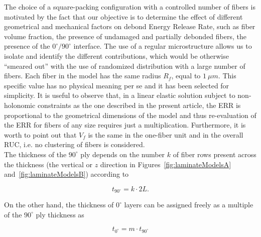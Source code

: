 \documentclass[review]{elsarticle}
\begin{document}
The choice of a square-packing configuration with a controlled number of fibers is motivated by the fact that our objective is to determine the effect of different geometrical and mechanical factors on debond Energy Release Rate, such as fiber volume fraction, the presence of undamaged and partially debonded fibers, the presence of the $0^{\circ}/90^{\circ}$ interface. The use of a regular microstructure allows us to isolate and identify the different contributions, which would be otherwise ``smeared out'' with the use of randomized distribution with a large number of fibers. Each fiber in the model has the same radius $R_{f}$, equal to $1\ \mu m$. This specific value has no physical meaning per se and it has been selected for simplicity. It is useful to observe that, in a linear elastic solution subject to non-holonomic constraints as the one described in the present article, the ERR is proportional to the geometrical dimensions of the model and thus re-evaluation of the ERR for fibers of any size requires just a multiplication. Furthermore, it is worth to point out that $V_{f}$ is the same in the one-fiber unit and in the overall RUC, i.e. no clustering of fibers is considered.\\
The thickness of the $90^{\circ}$ ply depends on the number $k$ of fiber rows present across the thickness (the vertical or $z$ direction in Figures~\ref{fig:laminateModelsA} and~\ref{fig:laminateModelsB}) according to

\begin{equation}\label{eq:t90}
t_{90^{\circ}}=k\cdot2L.
\end{equation}

On the other hand, the thickness of $0^{\circ}$ layers can be assigned freely as a multiple of the $90^{\circ}$ ply thickness as

\begin{equation}\label{eq:t90}
t_{0^{\circ}}=m\cdot t_{90^{\circ}}
\end{equation}
\end{document}
